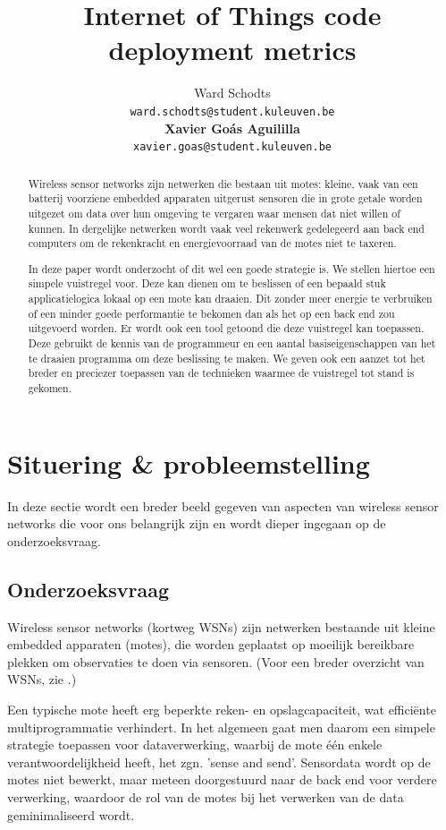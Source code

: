 \documentclass[11pt]{article}
\title{Internet of Things code deployment metrics}
\author{
  Ward Schodts\\
  \texttt{ward.schodts@student.kuleuven.be}
  \\[3ex]
  \textbf{Xavier Go\'as Aguililla}\\
  \texttt{xavier.goas@student.kuleuven.be}
}
\begin{document}
\maketitle

\listoftodos
\begin{abstract}
Wireless sensor networks zijn netwerken die bestaan uit motes: kleine, vaak van
een batterij voorziene embedded apparaten uitgerust sensoren die in grote
getale worden uitgezet om data over hun omgeving te vergaren waar mensen dat
niet willen of kunnen. In dergelijke netwerken wordt vaak veel rekenwerk
gedelegeerd aan back end computers om de rekenkracht en energievoorraad van de
motes niet te taxeren. 

In deze paper wordt onderzocht of dit wel een goede strategie is. We stellen
hiertoe een simpele vuistregel voor. Deze kan dienen om te beslissen of een
bepaald stuk applicatielogica lokaal op een mote kan draaien. Dit zonder meer
energie te verbruiken of een minder goede performantie te bekomen dan als het op een back end zou uitgevoerd worden. Er wordt ook een tool getoond die deze vuistregel
kan toepassen. Deze gebruikt de kennis van de programmeur en een aantal
basiseigenschappen van het te draaien programma om deze beslissing te maken. We
geven ook een aanzet tot het breder en preciezer toepassen van de technieken
waarmee de vuistregel tot stand is gekomen.
  
\end{abstract}

\section{Situering \& probleemstelling}

In deze sectie wordt een breder beeld gegeven van aspecten van wireless
sensor networks die voor ons belangrijk zijn en wordt dieper ingegaan op de
onderzoeksvraag.

\subsection{Onderzoeksvraag}

Wireless sensor networks (kortweg WSNs) zijn netwerken bestaande uit kleine
embedded apparaten (motes), die worden geplaatst op moeilijk bereikbare plekken
om observaties te doen via sensoren. (Voor een breder overzicht van
WSNs, zie \cite{akyildiz2002wireless}.)

Een typische mote heeft erg beperkte reken- en opslagcapaciteit, wat
effici\"ente multiprogrammatie verhindert. In het algemeen gaat men daarom een
simpele strategie toepassen voor dataverwerking, waarbij de mote \'e\'en enkele
verantwoordelijkheid heeft, het zgn. 'sense and send'. Sensordata wordt op de
motes niet bewerkt, maar meteen doorgestuurd naar de back end voor verdere
verwerking, waardoor de rol van de motes bij het verwerken van de data
geminimaliseerd wordt.
\end{document}
